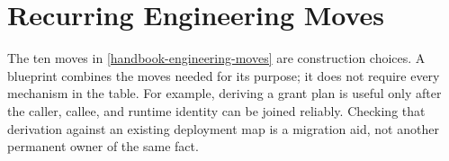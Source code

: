 \section{Recurring Engineering Moves}\label{heading:handbook-composition-procedure}

The ten moves in \autoref{handbook-engineering-moves} are construction choices. A blueprint combines the moves needed for its purpose; it does not require every mechanism in the table. For example, deriving a grant plan is useful only after the caller, callee, and runtime identity can be joined reliably. Checking that derivation against an existing deployment map is a migration aid, not another permanent owner of the same fact.

